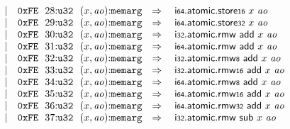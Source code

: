 $$\begin{array}[t]{@{}lrrl@{}l@{}l@{}l@{}}
& & | & \mathtt{0xFE}~~28{:}{\mathtt{u32}}~~(x, {\mathit{ao}}){:}{\mathtt{memarg}} & \quad\Rightarrow\quad{} & {\mathsf{i{\scriptstyle 64}}{.}\mathsf{atomic}{.}\mathsf{store}}{\mathsf{{\scriptstyle 16}}}~x~{\mathit{ao}} \\
& & | & \mathtt{0xFE}~~29{:}{\mathtt{u32}}~~(x, {\mathit{ao}}){:}{\mathtt{memarg}} & \quad\Rightarrow\quad{} & {\mathsf{i{\scriptstyle 64}}{.}\mathsf{atomic}{.}\mathsf{store}}{\mathsf{{\scriptstyle 32}}}~x~{\mathit{ao}} \\
& & | & \mathtt{0xFE}~~30{:}{\mathtt{u32}}~~(x, {\mathit{ao}}){:}{\mathtt{memarg}} & \quad\Rightarrow\quad{} & \mathsf{i{\scriptstyle 32}}{.}\mathsf{atomic}{.}\mathsf{rmw}~\mathsf{add}~x~{\mathit{ao}} \\
& & | & \mathtt{0xFE}~~31{:}{\mathtt{u32}}~~(x, {\mathit{ao}}){:}{\mathtt{memarg}} & \quad\Rightarrow\quad{} & \mathsf{i{\scriptstyle 64}}{.}\mathsf{atomic}{.}\mathsf{rmw}~\mathsf{add}~x~{\mathit{ao}} \\
& & | & \mathtt{0xFE}~~32{:}{\mathtt{u32}}~~(x, {\mathit{ao}}){:}{\mathtt{memarg}} & \quad\Rightarrow\quad{} & {\mathsf{i{\scriptstyle 32}}{.}\mathsf{atomic}{.}\mathsf{rmw}}{\mathsf{{\scriptstyle 8}}}~\mathsf{add}~x~{\mathit{ao}} \\
& & | & \mathtt{0xFE}~~33{:}{\mathtt{u32}}~~(x, {\mathit{ao}}){:}{\mathtt{memarg}} & \quad\Rightarrow\quad{} & {\mathsf{i{\scriptstyle 32}}{.}\mathsf{atomic}{.}\mathsf{rmw}}{\mathsf{{\scriptstyle 16}}}~\mathsf{add}~x~{\mathit{ao}} \\
& & | & \mathtt{0xFE}~~34{:}{\mathtt{u32}}~~(x, {\mathit{ao}}){:}{\mathtt{memarg}} & \quad\Rightarrow\quad{} & {\mathsf{i{\scriptstyle 64}}{.}\mathsf{atomic}{.}\mathsf{rmw}}{\mathsf{{\scriptstyle 8}}}~\mathsf{add}~x~{\mathit{ao}} \\
& & | & \mathtt{0xFE}~~35{:}{\mathtt{u32}}~~(x, {\mathit{ao}}){:}{\mathtt{memarg}} & \quad\Rightarrow\quad{} & {\mathsf{i{\scriptstyle 64}}{.}\mathsf{atomic}{.}\mathsf{rmw}}{\mathsf{{\scriptstyle 16}}}~\mathsf{add}~x~{\mathit{ao}} \\
& & | & \mathtt{0xFE}~~36{:}{\mathtt{u32}}~~(x, {\mathit{ao}}){:}{\mathtt{memarg}} & \quad\Rightarrow\quad{} & {\mathsf{i{\scriptstyle 64}}{.}\mathsf{atomic}{.}\mathsf{rmw}}{\mathsf{{\scriptstyle 32}}}~\mathsf{add}~x~{\mathit{ao}} \\
& & | & \mathtt{0xFE}~~37{:}{\mathtt{u32}}~~(x, {\mathit{ao}}){:}{\mathtt{memarg}} & \quad\Rightarrow\quad{} & \mathsf{i{\scriptstyle 32}}{.}\mathsf{atomic}{.}\mathsf{rmw}~\mathsf{sub}~x~{\mathit{ao}} \\

\end{array}$$
